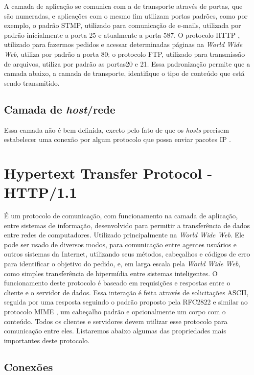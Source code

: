 A camada de aplicação se comunica com a de transporte através de portas, que são numeradas, e aplicações com o mesmo fim utilizam portas padrões, como por exemplo, o padrão STMP, utilizado para comunicação de e-mails, utilizada por padrão inicialmente a porta 25 e atualmente a porta 587. O protocolo HTTP \cite{rfc2616_http1.1}, utilizado para fazermos pedidos e acessar determinadas páginas na \textit{World Wide Web}, utiliza por padrão a porta 80; o protocolo FTP, utilizado para transmissão de arquivos, utiliza por padrão as portas20 e 21. Essa padronização permite que a camada abaixo, a camada de transporte, identifique o tipo de conteúdo que está sendo transmitido.


\subsection{Camada de \textit{host}/rede}
Essa camada não é bem definida, exceto pelo fato de que os \textit{hosts} precisem estabelecer uma conexão por algum protocolo que possa enviar pacotes IP \cite{tanenbaumredes}.


\section{Hypertext Transfer Protocol - HTTP/1.1}
É um protocolo de comunicação, com funcionamento na camada de aplicação, entre sistemas de informação, desenvolvido para permitir a transferência de dados entre redes de computadores. Utilizado principalmente na \textit{World Wide Web}.
Ele pode ser usado de diversos modos, para comunicação entre agentes usuários e outros sistemas da Internet, utilizando seus métodos, cabeçalhos e códigos de erro para identificar o objetivo do pedido, e, em larga escala pela \textit{World Wide Web}, como simples transferência de hipermídia entre sistemas inteligentes.
O funcionamento deste protocolo é baseado em requisições e respostas entre o cliente e o servidor de dados. Essa interação é feita através de solicitações ASCII, seguida por uma resposta seguindo o padrão proposto pela RFC2822 \cite{rfc2822_resnick_int_message_format} e similar ao protocolo MIME \cite{rfc2045_freed_borestein_mime}, um cabeçalho padrão e opcionalmente um corpo com o conteúdo. Todos os clientes e servidores devem utilizar esse protocolo para comunicação entre eles. Listaremos abaixo algumas das propriedades mais importantes deste protocolo.


\subsection{Conexões}

